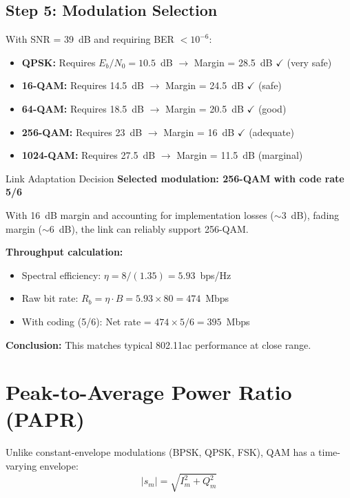 \subsection*{Step 5: Modulation Selection}

With SNR = 39~dB and requiring BER $< 10^{-6}$:

\begin{itemize}
\item \textbf{QPSK:} Requires $E_b/N_0 = 10.5$~dB $\rightarrow$ Margin = 28.5~dB $\checkmark$ (very safe)
\item \textbf{16-QAM:} Requires 14.5~dB $\rightarrow$ Margin = 24.5~dB $\checkmark$ (safe)
\item \textbf{64-QAM:} Requires 18.5~dB $\rightarrow$ Margin = 20.5~dB $\checkmark$ (good)
\item \textbf{256-QAM:} Requires 23~dB $\rightarrow$ Margin = 16~dB $\checkmark$ (adequate)
\item \textbf{1024-QAM:} Requires 27.5~dB $\rightarrow$ Margin = 11.5~dB (marginal)
\end{itemize}

\begin{calloutbox}[colback=black!8!white,colframe=black]{Link Adaptation Decision}
\textbf{Selected modulation: 256-QAM with code rate 5/6}

With 16~dB margin and accounting for implementation losses ($\sim$3~dB), fading margin ($\sim$6~dB), the link can reliably support 256-QAM.

\textbf{Throughput calculation:}
\begin{itemize}
\item Spectral efficiency: $\eta = 8/(1.35) = 5.93$~bps/Hz
\item Raw bit rate: $R_b = \eta \cdot B = 5.93 \times 80 = 474$~Mbps
\item With coding (5/6): Net rate = $474 \times 5/6 = 395$~Mbps
\end{itemize}

\textbf{Conclusion:} This matches typical 802.11ac performance at close range.
\end{calloutbox}

\section{Peak-to-Average Power Ratio (PAPR)}

Unlike constant-envelope modulations (BPSK, QPSK, FSK), QAM has a time-varying envelope:
\begin{equation}
|s_m| = \sqrt{I_m^2 + Q_m^2}
\label{eq:qam-envelope}
\end{equation}

